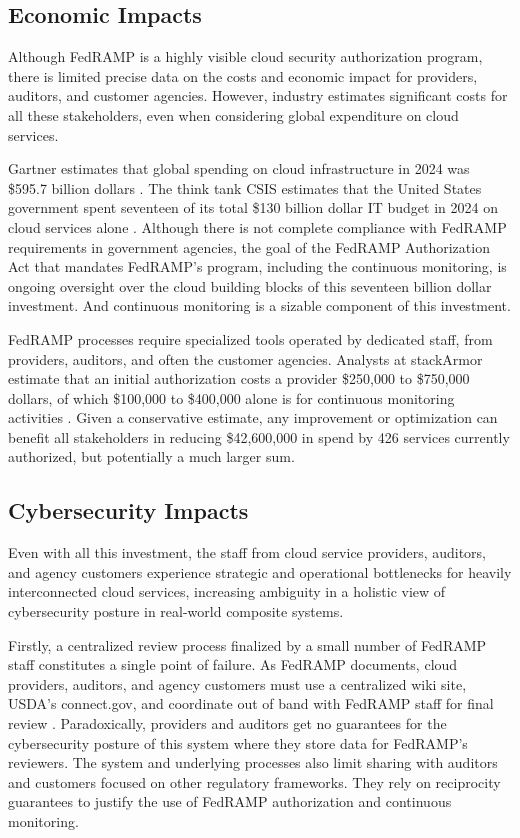 \documentclass{jdf}
\begin{document}
\subsection{Economic Impacts}

Although FedRAMP is a highly visible cloud security authorization program, there is limited precise data on the costs and economic impact for providers, auditors, and customer agencies. However, industry estimates significant costs for all these stakeholders, even when considering global expenditure on cloud services.

Gartner estimates that global spending on cloud infrastructure in 2024 was \$595.7 billion dollars \citeyear{gartner24}. The think tank CSIS estimates that the United States government spent seventeen of its total \$130 billion dollar IT budget in 2024 on cloud services alone \citeyear[p.~1]{csis25}. Although there is not complete compliance with FedRAMP requirements in government agencies, the goal of the FedRAMP Authorization Act that mandates FedRAMP's program, including the continuous monitoring, is ongoing oversight over the cloud building blocks of this seventeen billion dollar investment. And continuous monitoring is a sizable component of this investment.

FedRAMP processes require specialized tools operated by dedicated staff, from providers, auditors, and often the customer agencies. Analysts at stackArmor estimate that an initial authorization costs a provider \$250,000 to \$750,000 dollars, of which \$100,000 to \$400,000 alone is for continuous monitoring activities \citeyear{stackarmor24}. Given a conservative estimate, any improvement or optimization can benefit all stakeholders in reducing \$42,600,000 in spend by 426 services currently authorized, but potentially a much larger sum.

\subsection{Cybersecurity Impacts}

Even with all this investment, the staff from cloud service providers, auditors, and agency customers experience strategic and operational bottlenecks for heavily interconnected cloud services, increasing ambiguity in a holistic view of cybersecurity posture in real-world composite systems. 

Firstly, a centralized review process finalized by a small number of FedRAMP staff constitutes a single point of failure. As FedRAMP documents, cloud providers, auditors, and agency customers must use a centralized wiki site, USDA's connect.gov, and coordinate out of band with FedRAMP staff for final review \citeyear[pp.~3,14]{fedramp_auth_playbook25}. Paradoxically, providers and auditors get no guarantees for the cybersecurity posture of this system where they store data for FedRAMP's reviewers. The system and underlying processes also limit sharing with auditors and customers focused on other regulatory frameworks. They rely on reciprocity guarantees to justify the use of FedRAMP authorization and continuous monitoring.
\end{document}
